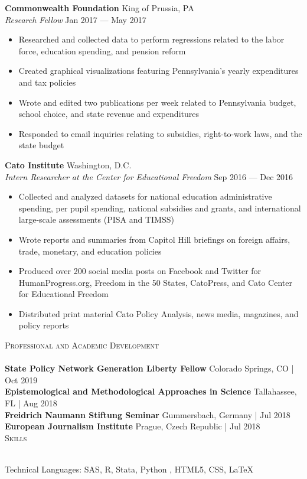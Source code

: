 \documentclass[a4paper]{article}
\newcommand{\lineunder} {
    \vspace*{-8pt} \\
    \hspace*{-18pt} \hrulefill \\
}
\newcommand{\header} [1] {
    {\hspace*{-18pt}\vspace*{6pt} \textsc{\large{#1}}}
    \vspace*{-6pt} \lineunder
}
\begin{document}
\textbf{Commonwealth Foundation} \hfill King of Prussia, PA\\
\textit{Research Fellow} \hfill Jan 2017 --- May 2017\\
\begin{itemize}[noitemsep,nolistsep]
	\item Researched and collected data to perform regressions related to the labor force, education spending, and pension reform
	\item Created graphical visualizations featuring Pennsylvania’s yearly expenditures and tax policies
	\item Wrote and edited two publications per week related to Pennsylvania budget, school choice, and state revenue and expenditures
	\item Responded to email inquiries relating to subsidies, right-to-work laws, and the state budget
\end{itemize}
\vspace{1mm}
\textbf{Cato Institute} \hfill Washington, D.C.\\
\textit{Intern Researcher at the Center for Educational Freedom} \hfill Sep 2016 --- Dec 2016\\
\begin{itemize}[noitemsep,nolistsep]
	\item Collected and analyzed datasets for national education administrative spending, per pupil spending, national subsidies and grants, and international large-scale assessments (PISA and TIMSS)
	\item Wrote reports and summaries from Capitol Hill briefings on foreign affairs, trade, monetary, and education policies
	\item Produced over 200 social media posts on Facebook and Twitter for HumanProgress.org, Freedom in the 50 States, CatoPress, and Cato Center for Educational Freedom
	\item Distributed print material Cato Policy Analysis, news media, magazines, and policy reports
\end{itemize}
\vspace{2mm}

\header{Professional and Academic Development} 
\textbf{State Policy Network Generation Liberty Fellow} \hfill Colorado Springs, CO | Oct 2019 \\
\vspace{1mm}
\textbf{Epistemological and Methodological Approaches in Science} \hfill Tallahassee, FL | Aug 2018\\
\vspace{1mm}
\textbf{Freidrich Naumann Stiftung Seminar} \hfill Gummersbach, Germany | Jul 2018\\
\vspace{1mm}
\textbf{European Journalism Institute} \hfill Prague, Czech Republic | Jul 2018\\

\header{Skills}
\vspace{1mm}

Technical Languages: SAS, R, Stata, Python , HTML5, CSS, \LaTeX\\
\end{document}
